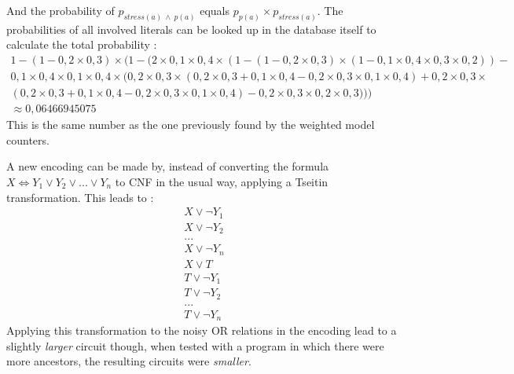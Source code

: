 And the probability of $p_{stress(a)\ \land\ p(a)}$ equals $p_{p(a)}\times p_{stress(a)}$.
The probabilities of all involved literals can be looked up in the database itself to calculate the total probability :
\begin{gather*}
1-(1-0,2\times 0,3)\times (1-(2\times 0,1\times 0,4\times (1-(1-0,2\times 0,3)\times (1-0,1\times 0,4\times 0,3\times 0,2))-\\
0,1\times 0,4\times 0,1\times 0,4\times (0,2\times 0,3\times (0,2\times 0,3+0,1\times 0,4-0,2\times 0,3\times 0,1\times 0,4)+0,2\times 0,3\times\\ 
(0,2\times 0,3+0,1\times 0,4-0,2\times 0,3\times 0,1\times 0,4)-0,2\times 0,3\times 0,2\times 0,3)))\\
\approx 0,06466945075
\end{gather*}This is the same number as the one previously found by the weighted model counters.


A new encoding can be made by, instead of converting the formula $X\Leftrightarrow Y_1\lor Y_2 \lor ... \lor Y_n$ to CNF in the usual way, applying a Tseitin transformation. This leads to :
\begin{gather*}
X \lor \lnot Y_1\\
X \lor \lnot Y_2\\
...\\
X \lor \lnot Y_n\\
X \lor T\\
T \lor \lnot Y_1\\
T \lor \lnot Y_2\\
...\\
T \lor \lnot Y_n
\end{gather*}
Applying this transformation to the noisy OR relations in the encoding lead to a slightly \textit{larger} circuit though, when tested with a program in which there were more ancestors, the resulting circuits were \textit{smaller}.